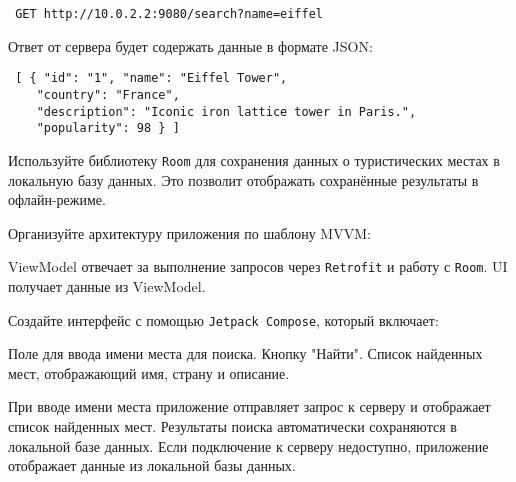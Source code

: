 \documentclass[a4paper,12pt]{article}
\begin{document}
\begin{verbatim} GET http://10.0.2.2:9080/search?name=eiffel \end{verbatim}

Ответ от сервера будет содержать данные в формате JSON:

\begin{verbatim} [ { "id": "1", "name": "Eiffel Tower", 
    "country": "France", 
    "description": "Iconic iron lattice tower in Paris.", 
    "popularity": 98 } ] \end{verbatim}


Используйте библиотеку \texttt{Room} для сохранения данных о туристических местах в локальную базу данных. Это позволит отображать сохранённые результаты в офлайн-режиме.


Организуйте архитектуру приложения по шаблону MVVM:

ViewModel отвечает за выполнение запросов через \texttt{Retrofit} и работу с \texttt{Room}.
UI получает данные из ViewModel.

Создайте интерфейс с помощью \texttt{Jetpack Compose}, который включает:

Поле для ввода имени места для поиска.
Кнопку "Найти".
Список найденных мест, отображающий имя, страну и описание.

При вводе имени места приложение отправляет запрос к серверу и отображает список найденных мест.
Результаты поиска автоматически сохраняются в локальной базе данных.
Если подключение к серверу недоступно, приложение отображает данные из локальной базы данных.
\end{document}
